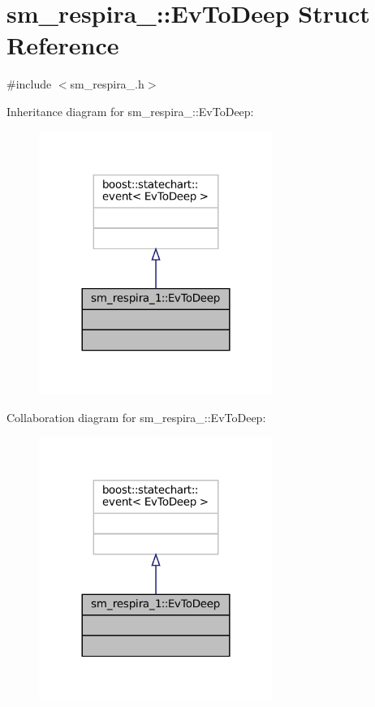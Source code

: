 \hypertarget{structsm__respira__1_1_1EvToDeep}{}\section{sm\+\_\+respira\+\_\+:\+:Ev\+To\+Deep Struct Reference}
\label{structsm__respira__1_1_1EvToDeep}


{\ttfamily \#include $<$sm\+\_\+respira\+\_.\+h$>$}



Inheritance diagram for sm\+\_\+respira\+\_\+:\+:Ev\+To\+Deep\+:
\nopagebreak
\begin{figure}[H]
\begin{center}
\leavevmode
\includegraphics[width=216pt]{structsm__respira__1_1_1EvToDeep__inherit__graph}
\end{center}
\end{figure}


Collaboration diagram for sm\+\_\+respira\+\_\+:\+:Ev\+To\+Deep\+:
\nopagebreak
\begin{figure}[H]
\begin{center}
\leavevmode
\includegraphics[width=216pt]{structsm__respira__1_1_1EvToDeep__coll__graph}
\end{center}
\end{figure}


